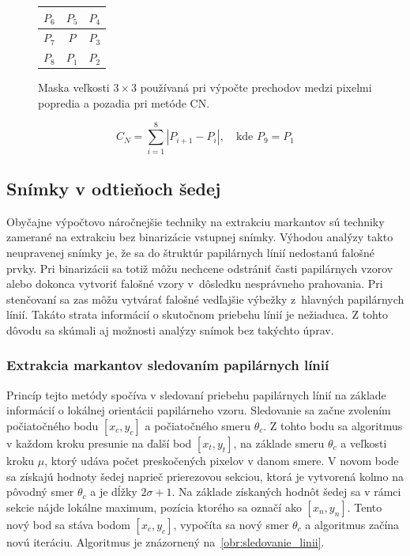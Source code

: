   \begin{figure}[h]
    \centering
      \begin{tabular}{ | l | c | r | }
        \hline
        $P_6$ & $P_5$ & $P_4$ \\ \hline
        $P_7$ & $P$ & $P_3$ \\ \hline
        $P_8$ & $P_1$ & $P_2$ \\
        \hline
      \end{tabular}
    \caption{Maska veľkosti $3\times{}3$ používaná pri výpočte prechodov medzi pixelmi popredia a pozadia pri metóde CN.}
    \label{obr:maska_CN}
  \end{figure}

  \begin{equation}
    C_N = \sum_{i=1}^{8} | P_{i+1} - P_{i} |, \quad\text{kde } P_9 = P_1
    \label{rov:crossing_number}
  \end{equation}

  \subsection{Snímky v odtieňoch šedej}
  Obyčajne výpočtovo náročnejšie techniky na extrakciu markantov sú techniky zamerané na extrakciu bez binarizácie vstupnej snímky. Výhodou analýzy
  takto neupravenej snímky je, že sa do štruktúr papilárnych línií nedostanú falošné prvky. Pri binarizácii sa totiž môžu nechcene odstrániť časti
  papilárnych vzorov alebo dokonca vytvoriť falošné vzory v~dôsledku nesprávneho prahovania. Pri stenčovaní sa zas môžu vytvárať falošné vedľajšie výbežky
  z~hlavných papilárnych línií. Takáto strata informácií o skutočnom priebehu línií je nežiaduca. Z tohto dôvodu sa skúmali aj možnosti analýzy snímok bez
  takýchto úprav.

  \subsubsection*{Extrakcia markantov sledovaním papilárnych línií}
  Princíp tejto metódy spočíva v sledovaní priebehu papilárnych línií na základe informácií o lokálnej orientácii papilárneho vzoru. Sledovanie sa začne
  zvolením počiatočného bodu $[x_c, y_c]$ a počiatočného smeru $\theta{}_c$. Z tohto bodu sa algoritmus v každom kroku presunie na ďalší bod $[x_t, y_t]$,
  na základe smeru $\theta{}_c$ a veľkosti kroku $\mu$, ktorý udáva počet preskočených pixelov v danom smere. V novom bode sa získajú hodnoty šedej
  naprieč prierezovou sekciou, ktorá je vytvorená kolmo na pôvodný smer $\theta{}_c$ a je dĺžky $2\sigma + 1$. Na základe získaných hodnôt šedej sa
  v rámci sekcie nájde lokálne maximum, pozícia ktorého sa označí ako $[x_n, y_n]$. Tento nový bod sa stáva bodom $[x_c, y_c]$,
  vypočíta sa nový smer $\theta{}_c$ a algoritmus začína novú iteráciu. Algoritmus je znázornený na~{\ref{obr:sledovanie_linii}}.

